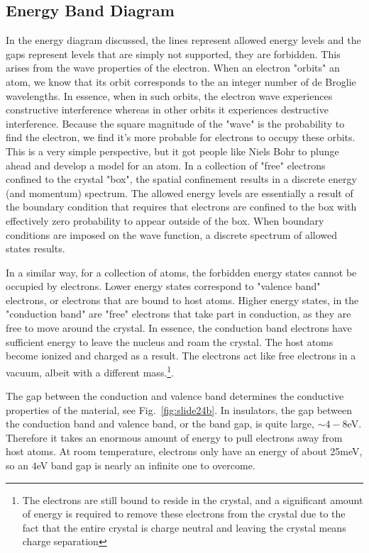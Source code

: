 \subsection{Energy Band Diagram}
In the energy diagram discussed, the lines represent allowed energy levels and the gaps represent levels that are simply not supported, they are forbidden.  This arises from the wave properties of the electron.  When an electron "orbits" an atom, we know that its orbit corresponds to the an integer number of de Broglie wavelengths.  In essence, when in such orbits, the electron wave experiences constructive interference whereas in other orbits it experiences destructive interference.  Because the square magnitude of the "wave" is the probability to find the electron, we find it's more probable for electrons to occupy these orbits.  This is a very simple perspective, but it got people like Niels Bohr to plunge ahead and develop a model for an atom.   In a collection of "free" electrons confined to the crystal "box", the spatial confinement results in a discrete energy (and momentum) spectrum.  The allowed energy levels are essentially a result of the boundary condition that requires that electrons are confined to the box with effectively zero probability to appear outside of the box.  When boundary conditions are imposed on the wave function, a discrete spectrum of allowed states results. 

In a similar way, for a collection of atoms, the forbidden energy states cannot be occupied by electrons.    Lower energy states correspond to "valence band" electrons, or electrons that are bound to host atoms.  Higher energy states, in the "conduction band" are "free" electrons that take part in conduction, as they are free to move around the crystal.  In essence, the conduction band electrons have sufficient energy to leave the nucleus and roam the crystal.  The host atoms become ionized and charged as a result.   The electrons act like free electrons in a vacuum, albeit with a different mass.\footnote{The electrons are still bound to reside in the crystal, and a significant amount of energy is required to remove these electrons from the crystal due to the fact that the entire crystal is charge neutral and leaving the crystal means charge separation}. 

The gap between the conduction and valence band determines the conductive properties of the material, see Fig.~\ref{fig:slide24b}.  In insulators, the gap between the conduction band and  valence band, or the band gap, is quite large,  $\sim 4-8$eV.  Therefore it takes an enormous amount of energy to pull electrons away from host atoms.  At room temperature, electrons only have an energy of about 25meV, so an $4$eV band gap is nearly an infinite one to overcome. 

